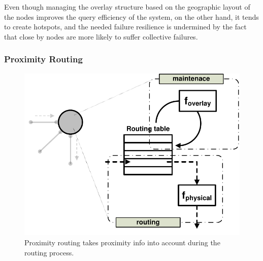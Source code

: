 Even though managing the overlay structure based on the geographic layout of the
nodes improves the query efficiency of the system, on the other hand, it tends
to create hotspots, and the needed failure resilience is undermined by the fact
that close by nodes are more likely to suffer collective failures.


%
%
%

\subsubsection{Proximity Routing}

\begin{figure}[ht]
\centering
  \includegraphics[scale=0.4]{img/pdf/proximity-routing.pdf}
\caption{Proximity routing takes proximity info into account during the
routing process.}
\label{figure:proximity-routing}
\end{figure}

